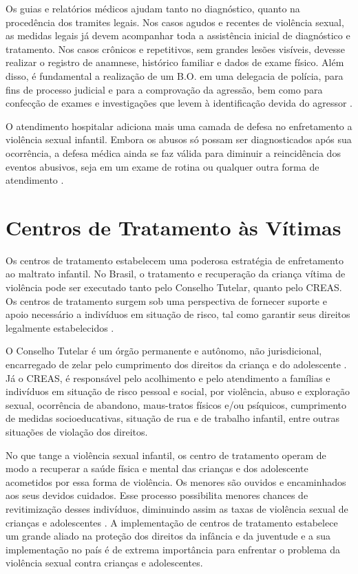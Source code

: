 Os guias e relatórios médicos ajudam tanto no diagnóstico, quanto na procedência dos tramites legais. Nos casos agudos e recentes de violência sexual, as medidas legais já devem acompanhar toda a assistência inicial de diagnóstico e tratamento. Nos casos crônicos e repetitivos, sem grandes lesões visíveis, devesse realizar o registro de anamnese, histórico familiar e dados de exame físico. Além disso, é fundamental a realização de um \ac{B.O.} em uma delegacia de polícia, para fins de processo judicial e para a comprovação da agressão, bem como para confecção de exames e investigações que levem à identificação devida do agressor \cite{paiva2012violencia}. 

O atendimento hospitalar adiciona mais uma camada de defesa no enfretamento a violência sexual infantil. Embora os abusos só possam ser diagnosticados após sua ocorrência, a defesa médica ainda se faz válida para diminuir a reincidência dos eventos abusivos, seja em um exame de rotina ou qualquer outra forma de atendimento \cite{costa2019maus}.


\section{Centros de Tratamento às Vítimas}\label{sec:centros}

Os centros de tratamento estabelecem uma poderosa estratégia de enfretamento ao maltrato infantil. No Brasil, o tratamento e recuperação da criança vítima de violência pode ser executado tanto pelo Conselho Tutelar, quanto pelo \ac{CREAS}. Os centros de tratamento surgem sob uma perspectiva de fornecer suporte e apoio necessário a indivíduos em situação de risco, tal como garantir seus direitos legalmente estabelecidos \cite{caccia2014conselheiros}.

O Conselho Tutelar é um órgão permanente e autônomo, não jurisdicional, encarregado de zelar pelo cumprimento dos direitos da criança e do adolescente \cite{brasil2002notificacao}. Já o \ac{CREAS}, é responsável pelo acolhimento e pelo atendimento a famílias e indivíduos em situação de risco pessoal e social, por violência, abuso e exploração sexual, ocorrência de abandono, maus-tratos físicos e/ou psíquicos, cumprimento de medidas socioeducativas, situação de rua e de trabalho infantil, entre outras situações de violação dos direitos.

No que tange a violência sexual infantil, os centro de tratamento operam de modo a recuperar a saúde física e mental das crianças e dos adolescente acometidos por essa forma de violência. Os menores são ouvidos e encaminhados aos seus devidos cuidados. Esse processo possibilita menores chances de revitimização desses indivíduos, diminuindo assim as taxas de violência sexual de crianças e adolescentes \cite{faraj2016atendimento}. A implementação de centros de tratamento estabelece um grande aliado na proteção dos direitos da infância e da juventude e a sua implementação no país é de extrema importância para enfrentar o problema da violência sexual contra crianças e adolescentes. 

